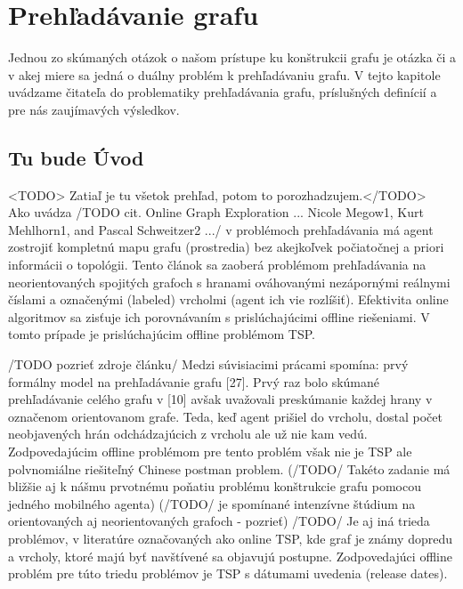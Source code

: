 \chapter{Prehľadávanie grafu}
\thispagestyle{empty}
Jednou zo skúmaných otázok o našom prístupe ku konštrukcii grafu je otázka či a v akej miere sa jedná o duálny problém k prehľadávaniu grafu. V tejto kapitole uvádzame čitateľa do problematiky prehľadávania grafu, príslušných definícií a pre nás zaujímavých výsledkov.
\section{Tu bude Úvod}
<TODO> Zatiaľ je tu všetok prehľad, potom to porozhadzujem.</TODO>\\
Ako uvádza /TODO cit. Online Graph Exploration ... Nicole Megow1, Kurt Mehlhorn1, and Pascal Schweitzer2 .../
v problémoch prehľadávania má agent zostrojiť kompletnú mapu grafu (prostredia) bez akejkoľvek počiatočnej a priori informácii o topológii.
Tento článok sa zaoberá problémom prehľadávania na neorientovaných spojitých grafoch s hranami ováhovanými nezápornými reálnymi číslami a označenými (labeled) vrcholmi (agent ich vie rozlíšiť).
Efektivita online algoritmov sa zisťuje ich porovnávaním s  prislúchajúcimi offline riešeniami. V tomto prípade je prislúchajúcim offline problémom TSP.

/TODO pozrieť zdroje článku/ Medzi súvisiacimi prácami spomína: prvý formálny model na prehľadávanie grafu [27].
Prvý raz bolo skúmané prehľadávanie celého grafu v [10] avšak uvažovali preskúmanie každej hrany v označenom orientovanom grafe. Teda, keď agent prišiel do vrcholu, dostal počet neobjavených hrán odchádzajúcich z vrcholu ale už nie kam vedú.
Zodpovedajúcim offline problémom pre tento problém však nie je TSP ale polvnomiálne riešiteľný Chinese postman problem.
(/TODO/ Takéto zadanie má bližšie aj k nášmu prvotnému poňatiu problému konštrukcie grafu pomocou jedného mobilného agenta)
(/TODO/ je spomínané intenzívne štúdium na orientovaných aj neorientovaných grafoch - pozrieť)
/TODO/ Je aj iná trieda problémov, v literatúre označovaných ako online TSP, kde graf je známy dopredu a vrcholy, ktoré majú byť navštívené sa objavujú postupne. Zodpovedajúci offline problém pre túto triedu problémov je TSP s dátumami uvedenia (release dates).
\newline


